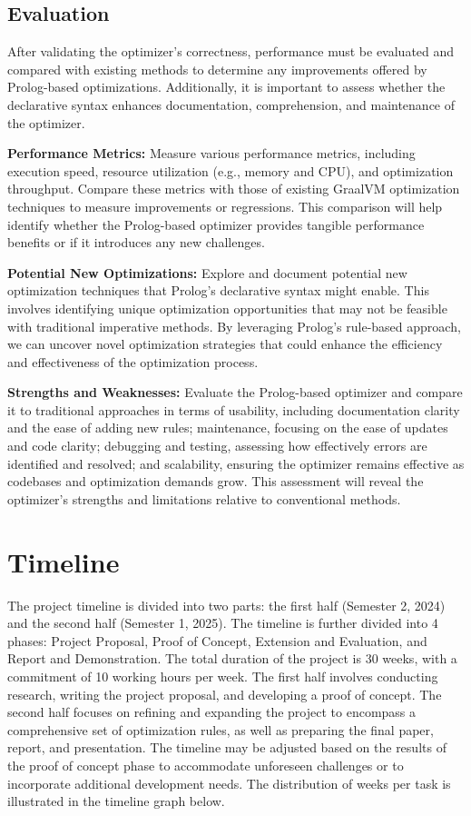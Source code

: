 \subsection{Evaluation}
After validating the optimizer's correctness, performance must be evaluated and compared with existing methods to determine any improvements offered by Prolog-based optimizations. Additionally, it is important to assess whether the declarative syntax enhances documentation, comprehension, and maintenance of the optimizer.
\begin{description}
    \item \textbf{Performance Metrics:} Measure various performance metrics, including execution speed, resource utilization (e.g., memory and CPU), and optimization throughput. Compare these metrics with those of existing GraalVM optimization techniques to measure improvements or regressions. This comparison will help identify whether the Prolog-based optimizer provides tangible performance benefits or if it introduces any new challenges.
    \item \textbf{Potential New Optimizations:} Explore and document potential new optimization techniques that Prolog's declarative syntax might enable. This involves identifying unique optimization opportunities that may not be feasible with traditional imperative methods. By leveraging Prolog’s rule-based approach, we can uncover novel optimization strategies that could enhance the efficiency and effectiveness of the optimization process.
    \item \textbf{Strengths and Weaknesses:} Evaluate the Prolog-based optimizer and compare it to traditional approaches in terms of usability, including documentation clarity and the ease of adding new rules; maintenance, focusing on the ease of updates and code clarity; debugging and testing, assessing how effectively errors are identified and resolved; and scalability, ensuring the optimizer remains effective as codebases and optimization demands grow. This assessment will reveal the optimizer’s strengths and limitations relative to conventional methods.
\end{description}


\section{Timeline}
The project timeline is divided into two parts: the first half (Semester 2, 2024) and the second half (Semester 1, 2025). The timeline is further divided into 4 phases: Project Proposal, Proof of Concept, Extension and Evaluation, and Report and Demonstration. The total duration of the project is 30 weeks, with a commitment of 10 working hours per week. The first half involves conducting research, writing the project proposal, and developing a proof of concept. The second half focuses on refining and expanding the project to encompass a comprehensive set of optimization rules, as well as preparing the final paper, report, and presentation. The timeline may be adjusted based on the results of the proof of concept phase to accommodate unforeseen challenges or to incorporate additional development needs.  The distribution of weeks per task is illustrated in the timeline graph below.


